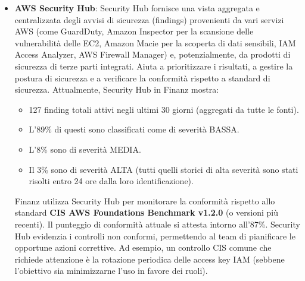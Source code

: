 \begin{itemize}
    \item \textbf{AWS Security Hub}: Security Hub fornisce una vista aggregata e centralizzata degli avvisi di sicurezza (findings) provenienti da vari servizi AWS (come GuardDuty, Amazon Inspector per la scansione delle vulnerabilità delle EC2, Amazon Macie per la scoperta di dati sensibili, IAM Access Analyzer, AWS Firewall Manager) e, potenzialmente, da prodotti di sicurezza di terze parti integrati. Aiuta a prioritizzare i risultati, a gestire la postura di sicurezza e a verificare la conformità rispetto a standard di sicurezza.
        Attualmente, Security Hub in Finanz mostra:
        \begin{itemize}
            \item 127 finding totali attivi negli ultimi 30 giorni (aggregati da tutte le fonti).
            \item L'89\% di questi sono classificati come di severità BASSA.
            \item L'8\% sono di severità MEDIA.
            \item Il 3\% sono di severità ALTA (tutti quelli storici di alta severità sono stati risolti entro 24 ore dalla loro identificazione).
        \end{itemize}
        Finanz utilizza Security Hub per monitorare la conformità rispetto allo standard \textbf{CIS AWS Foundations Benchmark v1.2.0} (o versioni più recenti). Il punteggio di conformità attuale si attesta intorno all'87\%. Security Hub evidenzia i controlli non conformi, permettendo al team di pianificare le opportune azioni correttive. Ad esempio, un controllo CIS comune che richiede attenzione è la rotazione periodica delle access key IAM (sebbene l'obiettivo sia minimizzarne l'uso in favore dei ruoli).
\end{itemize}

